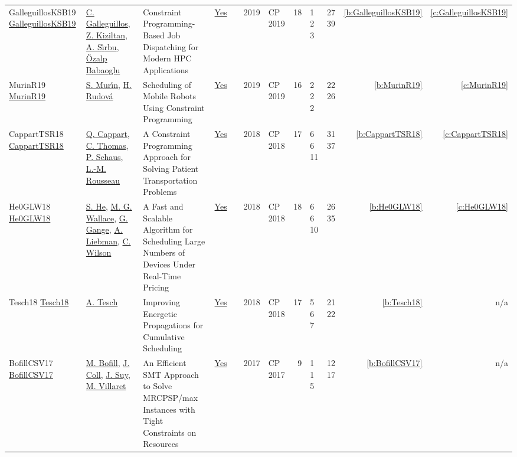 {\begin{longtable}{>{\raggedright\arraybackslash}p{3cm}>{\raggedright\arraybackslash}p{4.5cm}>{\raggedright\arraybackslash}p{6.0cm}rrrp{2.5cm}rp{1cm}p{1cm}rr}
GalleguillosKSB19 \href{https://doi.org/10.1007/978-3-030-30048-7_26}{GalleguillosKSB19} & \hyperref[auth:a96]{C. Galleguillos}, \hyperref[auth:a97]{Z. Kiziltan}, \hyperref[auth:a98]{A. S{\^{\i}}rbu}, \hyperref[auth:a99]{{\"{O}}zalp Babaoglu} & \cellcolor{green!10}Constraint Programming-Based Job Dispatching for Modern {HPC} Applications & \href{../works/GalleguillosKSB19.pdf}{Yes} & \cite{GalleguillosKSB19} & 2019 & CP 2019 & 18 & 1 2 3 & 27 39 & \ref{b:GalleguillosKSB19} & \ref{c:GalleguillosKSB19}\\
MurinR19 \href{https://doi.org/10.1007/978-3-030-30048-7_27}{MurinR19} & \hyperref[auth:a100]{S. Mur{\'{\i}}n}, \hyperref[auth:a101]{H. Rudov{\'{a}}} & Scheduling of Mobile Robots Using Constraint Programming & \href{../works/MurinR19.pdf}{Yes} & \cite{MurinR19} & 2019 & CP 2019 & 16 & 2 2 2 & 22 26 & \ref{b:MurinR19} & \ref{c:MurinR19}\\
CappartTSR18 \href{https://doi.org/10.1007/978-3-319-98334-9_32}{CappartTSR18} & \hyperref[auth:a42]{Q. Cappart}, \hyperref[auth:a834]{C. Thomas}, \hyperref[auth:a147]{P. Schaus}, \hyperref[auth:a326]{L.-M. Rousseau} & A Constraint Programming Approach for Solving Patient Transportation Problems & \href{../works/CappartTSR18.pdf}{Yes} & \cite{CappartTSR18} & 2018 & CP 2018 & 17 & 6 6 11 & 31 37 & \ref{b:CappartTSR18} & \ref{c:CappartTSR18}\\
He0GLW18 \href{https://doi.org/10.1007/978-3-319-98334-9_42}{He0GLW18} & \hyperref[auth:a184]{S. He}, \hyperref[auth:a117]{M. G. Wallace}, \hyperref[auth:a185]{G. Gange}, \hyperref[auth:a186]{A. Liebman}, \hyperref[auth:a187]{C. Wilson} & A Fast and Scalable Algorithm for Scheduling Large Numbers of Devices Under Real-Time Pricing & \href{../works/He0GLW18.pdf}{Yes} & \cite{He0GLW18} & 2018 & CP 2018 & 18 & 6 6 10 & 26 35 & \ref{b:He0GLW18} & \ref{c:He0GLW18}\\
Tesch18 \href{https://doi.org/10.1007/978-3-319-98334-9_41}{Tesch18} & \hyperref[auth:a183]{A. Tesch} & Improving Energetic Propagations for Cumulative Scheduling & \href{../works/Tesch18.pdf}{Yes} & \cite{Tesch18} & 2018 & CP 2018 & 17 & 5 6 7 & 21 22 & \ref{b:Tesch18} & n/a\\
BofillCSV17 \href{https://doi.org/10.1007/978-3-319-66158-2_5}{BofillCSV17} & \hyperref[auth:a228]{M. Bofill}, \hyperref[auth:a1449]{J. Coll}, \hyperref[auth:a232]{J. Suy}, \hyperref[auth:a233]{M. Villaret} & An Efficient {SMT} Approach to Solve MRCPSP/max Instances with Tight Constraints on Resources & \href{../works/BofillCSV17.pdf}{Yes} & \cite{BofillCSV17} & 2017 & CP 2017 & 9 & 1 1 5 & 12 17 & \ref{b:BofillCSV17} & n/a\\

\end{longtable}}
